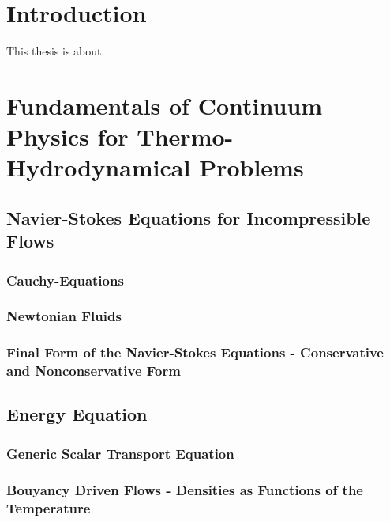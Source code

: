 \documentclass[article,type=msc,colorback,accentcolor=tud2a]{tudthesis}
\begin{document}
  \author{Fabian Nuraddin Alexander Gabel}
  \makethesistitle
  \tableofcontents

\printnomenclature
  \section{Introduction}

  This thesis is about. 

  \section{Fundamentals of Continuum Physics for Thermo-Hydrodynamical Problems}

    \subsection{Navier-Stokes Equations for Incompressible Flows}

      \subsubsection{Cauchy-Equations}
      \subsubsection{Newtonian Fluids}
      \subsubsection{Final Form of the Navier-Stokes Equations - Conservative and Nonconservative Form}

    \subsection{Energy Equation}

      \subsubsection{Generic Scalar Transport Equation}
      \subsubsection{Bouyancy Driven Flows - Densities as Functions of the Temperature}
\end{document}
